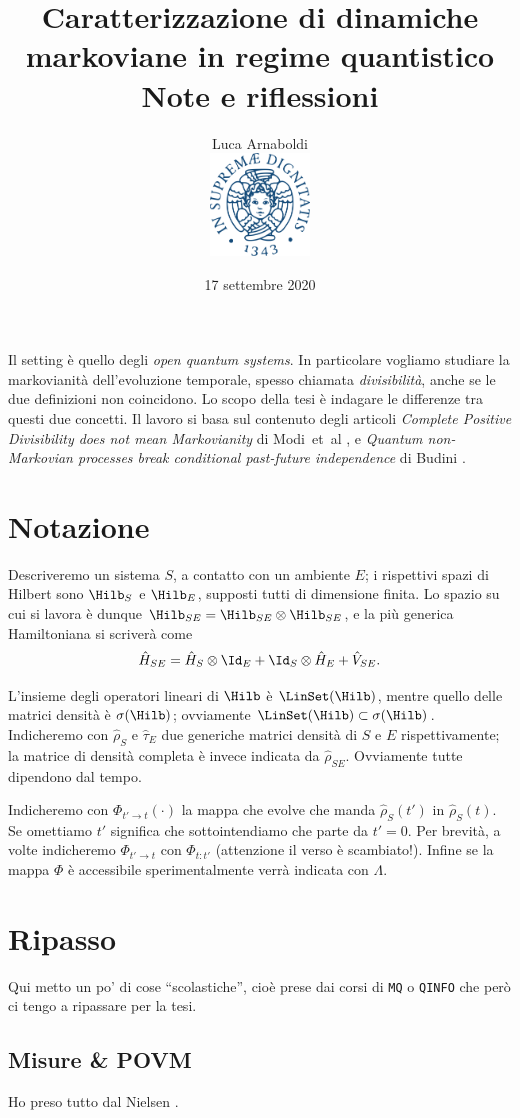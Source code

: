 \documentclass[a4]{article}
\title{Caratterizzazione di dinamiche markoviane in regime quantistico \\[1ex]
	   \large{Note e riflessioni}}
\author{Luca Arnaboldi \\ 
	\includegraphics[width=0.2\textwidth]{img/unipi-noscritta.png}}
\date{17 settembre 2020}
\begin{document}
\maketitle
\tableofcontents
\clearpage
Il setting è quello degli \emph{open quantum systems}. In particolare vogliamo studiare
la markovianità dell'evoluzione temporale, spesso chiamata \emph{divisibilità}, anche se
le due definizioni non coincidono. Lo scopo della tesi è indagare le differenze tra questi
due concetti. Il lavoro si basa sul contenuto degli articoli \emph{Complete Positive
Divisibility does not mean Markovianity} di Modi~et~al \cite{CPdoesnotimply}, e \emph{Quantum non-Markovian processes break conditional past-future independence} di Budini \cite{budini2018quantum}.

\section{Notazione}
Descriveremo un sistema \(S\), a contatto con un ambiente \(E\); i rispettivi spazi di
Hilbert sono \(\Hilb_S\) e \(\Hilb_E\), supposti tutti di dimensione finita. Lo spazio
su cui si lavora è dunque 
\(\Hilb_{SE} = \Hilb_{SE} \otimes \Hilb_{SE}\), e la più generica Hamiltoniana si
scriverà come
\[\hat{H}_{SE} = \hat{H}_S \otimes  \Id_E + \Id_S \otimes  \hat{H}_E + \hat{V}_{SE}.\]

L'insieme degli operatori lineari di \(\Hilb\) è \(\LinSet(\Hilb)\), mentre quello delle
matrici densità è \(\sigma(\Hilb)\); ovviamente \(\LinSet(\Hilb) \subset \sigma(\Hilb)\).
Indicheremo con \(\hat{\rho}_S\) e \(\hat{\tau}_E\) due generiche matrici densità di \(S\)
e \(E\) rispettivamente; la matrice di densità completa è invece indicata da \(\hat{\rho}_{SE}\).
Ovviamente tutte dipendono dal tempo.


Indicheremo con \(\Phi_{t'\to t}(\cdot)\) la mappa che evolve che manda \(\hat{\rho}_S(t')\)
in \(\hat{\rho}_S(t)\). Se omettiamo \(t'\) significa che sottointendiamo che parte da \(t'=0\).
Per brevità, a volte indicheremo \(\Phi_{t'\to t}\) con \(\Phi_{t:t'}\) (attenzione il verso è scambiato!).
Infine se la mappa \(\Phi\) è accessibile sperimentalmente verrà indicata con
\(\Lambda\).

\section{Ripasso}
Qui metto un po' di cose ``scolastiche'', cioè prese dai corsi di \texttt{MQ} o \texttt{QINFO}
che però ci tengo a ripassare per la tesi.
\subsection{Misure \& POVM}
Ho preso tutto dal Nielsen \cite{nielsen2010quantum}.
\end{document}

